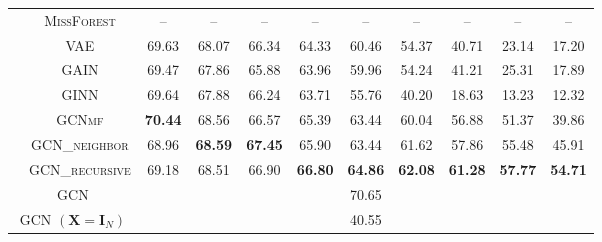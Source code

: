 \begin{table}[!pt]
{\begin{tabular}{c|c|ccccccccc}
& \textsc{MissForest} & -- & -- & -- & -- & -- & -- & -- & -- & --\\
& \textsc{VAE} & 69.63 & 68.07 & 66.34 & 64.33 & {60.46} & {54.37} & 40.71 & 23.14 & 17.20\\
& \textsc{GAIN} & 69.47 & 67.86 & 65.88 & 63.96 & 59.96 & 54.24 & {41.21} & {25.31} & 17.89\\
& \textsc{GINN} & 69.64 & 67.88 & 66.24 & 63.71 & 55.76 & 40.20 & 18.63 & 13.23 & 12.32\\
& \textsc{GCNmf} & \textbf{70.44} & 68.56 & 66.57 & 65.39 & 63.44 & 60.04 & 56.88 & 51.37 & 39.86\\ 
&\textsc{GCN\_neighbor} & 68.96 & \bf{68.59} & \bf{67.45} & 65.90 & 63.44 & 61.62 & 57.86 & 55.48 & 45.91 \\
& \textsc{GCN\_recursive} & 69.18 & 68.51 & 66.90 & \bf{66.80} & \bf{64.86} & \bf{62.08} & \bf{61.28} & \bf{57.77} & \bf{54.71} \\
\midrule
\multicolumn{2}{c|}{GCN}& \multicolumn{9}{c}{70.65}\\ 
\multicolumn{2}{c|}{GCN $(\mathbf{X} = \mathbf{I}_N)$}& \multicolumn{9}{c}{40.55}\\
\bottomrule
    \end{tabular}
    }
\end{table}

